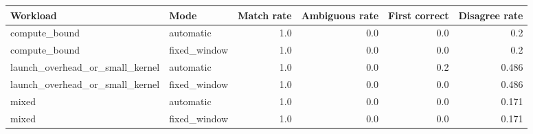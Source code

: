 \begin{tabular}{llrrrr}
\hline
Workload & Mode & Match rate & Ambiguous rate & First correct & Disagree rate \\
\hline
compute_bound & automatic & 1.0 & 0.0 & 0.0 & 0.2 \\
compute_bound & fixed_window & 1.0 & 0.0 & 0.0 & 0.2 \\
launch_overhead_or_small_kernel & automatic & 1.0 & 0.0 & 0.2 & 0.486 \\
launch_overhead_or_small_kernel & fixed_window & 1.0 & 0.0 & 0.0 & 0.486 \\
mixed & automatic & 1.0 & 0.0 & 0.0 & 0.171 \\
mixed & fixed_window & 1.0 & 0.0 & 0.0 & 0.171 \\
\hline
\end{tabular}
